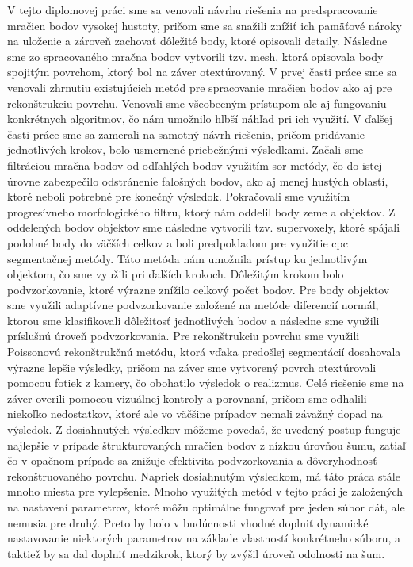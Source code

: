 V tejto diplomovej práci sme sa venovali návrhu riešenia na predspracovanie mračien bodov vysokej hustoty, pričom sme sa snažili znížiť ich pamäťové nároky na uloženie a zároveň zachovať dôležité body, ktoré opisovali detaily. Následne sme zo spracovaného mračna bodov vytvorili tzv. mesh, ktorá opisovala body spojitým povrchom, ktorý bol na záver otextúrovaný. 
\newline\indent V prvej časti práce sme sa venovali zhrnutiu existujúcich metód pre spracovanie mračien bodov ako aj pre rekonštrukciu povrchu. Venovali sme všeobecným prístupom ale aj fungovaniu konkrétnych algoritmov, čo nám umožnilo hlbší náhľad pri ich využití.
\newline\indent V ďalšej časti práce sme sa zamerali na samotný návrh riešenia, pričom pridávanie jednotlivých krokov, bolo usmernené priebežnými výsledkami. Začali sme filtráciou mračna bodov od odľahlých bodov využitím \acrshort{sor} metódy, čo do istej úrovne zabezpečilo odstránenie falošných bodov, ako aj menej hustých oblastí, ktoré neboli potrebné pre konečný výsledok. Pokračovali sme využitím progresívneho morfologického filtru, ktorý nám oddelil body zeme a objektov. Z oddelených bodov objektov sme následne vytvorili tzv. supervoxely, ktoré spájali podobné body do väčších celkov a boli predpokladom pre využitie \acrshort{cpc} segmentačnej metódy. Táto metóda nám umožnila prístup ku jednotlivým objektom, čo sme využili pri ďalších krokoch.
\newline\indent Dôležitým krokom bolo podvzorkovanie, ktoré výrazne znížilo celkový počet bodov. Pre body objektov sme využili adaptívne podvzorkovanie založené na metóde diferencií normál, ktorou sme klasifikovali dôležitosť jednotlivých bodov a následne sme využili príslušnú úroveň podvzorkovania. Pre rekonštrukciu povrchu sme využili Poissonovú rekonštrukčnú metódu, ktorá vďaka predošlej segmentácií dosahovala výrazne lepšie výsledky, pričom na záver sme vytvorený povrch otextúrovali pomocou fotiek z kamery, čo obohatilo výsledok o realizmus.
\newline\indent Celé riešenie sme na záver overili pomocou vizuálnej kontroly a porovnaní, pričom sme odhalili niekoľko nedostatkov, ktoré ale vo väčšine prípadov nemali závažný dopad na výsledok. Z dosiahnutých výsledkov môžeme povedať, že uvedený postup funguje najlepšie v prípade štrukturovaných mračien bodov z nízkou úrovňou šumu, zatiaľ čo v opačnom prípade sa znižuje efektivita podvzorkovania a dôveryhodnosť rekonštruovaného povrchu.
\newline\indent Napriek dosiahnutým výsledkom, má táto práca stále mnoho miesta pre vylepšenie. Mnoho využitých metód v tejto práci je založených na nastavení parametrov, ktoré môžu optimálne fungovať pre jeden súbor dát, ale nemusia pre druhý. Preto by bolo v budúcnosti vhodné doplniť dynamické nastavovanie niektorých parametrov na základe vlastností konkrétneho súboru, a taktiež by sa dal doplniť medzikrok, ktorý by zvýšil úroveň odolnosti na šum.
